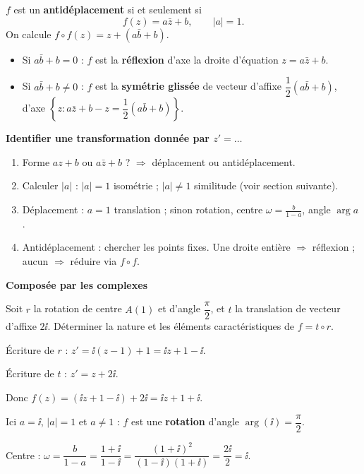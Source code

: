 \begin{theoreme}
	$f$ est un \textbf{antidéplacement} si et seulement si
	$$
	f(z) = a\bar z + b,\qquad |a|=1.
	$$
	On calcule $f\circ f(z) = z + (a\bar b + b)$.
	\begin{itemize}[label=\textbullet]
		\item Si $a\bar b + b = 0$ : $f$ est la \textbf{réflexion} d'axe la
		droite d'équation $z = a\bar z + b$.
		\item Si $a\bar b + b \neq 0$ : $f$ est la \textbf{symétrie glissée} de
		vecteur d'affixe $\dfrac{1}{2}(a\bar b + b)$, d'axe
		$\left\{z : a\bar z + b - z = \dfrac12(a\bar b + b)\right\}$.
	\end{itemize}
\end{theoreme}

\begin{methode}
	\textbf{Identifier une transformation donnée par $z'=\ldots$}
	\begin{enumerate}
		\item Forme $az+b$ ou $a\bar z+b$ ? $\Rightarrow$ déplacement ou
		antidéplacement.
		\item Calculer $|a|$ : $|a|=1$ isométrie ; $|a|\neq 1$ similitude
		(voir section suivante).
		\item Déplacement : $a=1$ translation ; sinon rotation, centre
		$\omega=\frac{b}{1-a}$, angle $\arg a$.
		\item Antidéplacement : chercher les points fixes. Une droite entière
		$\Rightarrow$ réflexion ; aucun $\Rightarrow$ réduire via $f\circ f$.
	\end{enumerate}
\end{methode}

\exerciceresolu
\textbf{Composée par les complexes}

Soit $r$ la rotation de centre $A(1)$ et d'angle $\dfrac{\pi}{2}$, et
$t$ la translation de vecteur d'affixe $2\ii$.
Déterminer la nature et les éléments caractéristiques de $f=t\circ r$.

\solution

Écriture de $r$ : $z' = \ii(z-1)+1 = \ii z + 1 - \ii$.

Écriture de $t$ : $z' = z + 2\ii$.

Donc $f(z) = (\ii z + 1 - \ii) + 2\ii = \ii z + 1 + \ii$.

Ici $a=\ii$, $|a|=1$ et $a\neq 1$ : $f$ est une \textbf{rotation} d'angle
$\arg(\ii)=\dfrac{\pi}{2}$.

Centre : $\omega = \dfrac{b}{1-a} = \dfrac{1+\ii}{1-\ii}
= \dfrac{(1+\ii)^2}{(1-\ii)(1+\ii)} = \dfrac{2\ii}{2} = \ii$.

